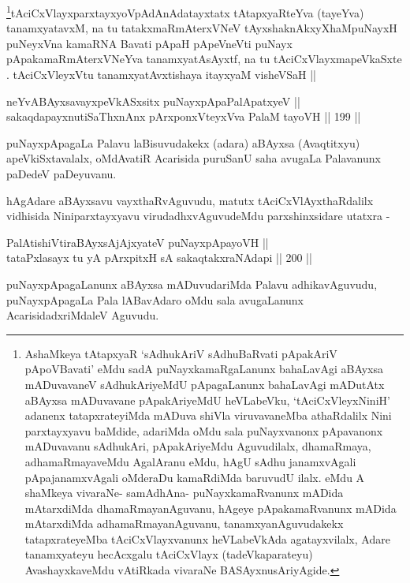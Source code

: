 \footnote{AshaMkeya tAtapxyaR `sAdhukAriV sAdhuBaRvati pApakAriV
pApoVBavati' eMdu sadA puNayxkamaRgaLanunx bahaLavAgi aBAyxsa
mADuvavaneV sAdhukAriyeMdU pApagaLanunx bahaLavAgi mADutAtx aBAyxsa
mADuvavane pApakAriyeMdU heVLabeVku, `tAciCxVleyxNiniH' adanenx
tatapxrateyiMda mADuva shiVla viruvavaneMba athaRdalilx Nini parxtayxyavu baMdide, adariMda oMdu sala puNayxvanonx pApavanonx
mADuvavanu sAdhukAri, pApakAriyeMdu Aguvudilalx, dhamaRmaya,
adhamaRmayaveMdu AgalAranu eMdu, hAgU sAdhu janamxvAgali
pApajanamxvAgali oMderaDu kamaRdiMda baruvudU ilalx. eMdu A shaMkeya
vivaraNe- samAdhAna- puNayxkamaRvanunx mADida mAtarxdiMda
dhamaRmayanAguvanu, hAgeye pApakamaRvanunx mADida mAtarxdiMda
adhamaRmayanAguvanu, tanamxyanAguvudakekx tatapxrateyeMba
tAciCxVlayxvanunx heVLabeVkAda agatayxvilalx, Adare tanamxyateyu
hecAcxgalu tAciCxVlayx (tadeVkaparateyu) AvashayxkaveMdu vAtiRkada
vivaraNe BASAyxnusAriyAgide.}tAciCxVlayxparxtayxyoVpAdAnAdatayxtatx tAtapxyaRteYva (tayeYva) tanamxyatavxM, na tu tatakxmaRmAterxVNeV tAyxshaknAkxyX\s \s haMpuNayxH puNeyxVna kamaRNA Bavati pApaH pApeVneVti puNayx pApakamaRmAterxVNeYva tanamxyatAsAyxtf, na tu tAciCxVlayxmapeVkaSxte . tAciCxVleyxVtu tanamxyatAvxtishaya itayxyaM visheVSaH ||


\begin{shl}
neYvABAyxsavayxpeVkASx\s sitx puNayxpApaPalApatxyeV || \\
sakaqdapayxnutiSaThxnAnx pArxponxVteyxVva PalaM tayoVH \hfill || 199 || 
\end{shl}

\begin{artha}
puNayxpApagaLa Palavu laBisuvudakekx (adara) aBAyxsa (Avaqtitxyu)
apeVkiSxtavalalx, oMdAvatiR Acarisida puruSanU saha avugaLa
Palavanunx paDedeV paDeyuvanu.
\end{artha}

\begin{artha}
hAgAdare aBAyxsavu vayxthaRvAguvudu, matutx tAciCxVlAyxthaRdalilx
vidhisida Niniparxtayxyavu virudadhxvAguvudeMdu parxshinxsidare utatxra -
\end{artha}

\begin{shl}
PalAtishiVtiraBAyxsAjAjxyateV puNayxpApayoVH || \\
tataPxlasayx tu yA pArxpitxH sA sakaqtakxraNAdapi \hfill || 200 ||  
\end{shl}

\begin{artha}
puNayxpApagaLanunx aBAyxsa mADuvudariMda Palavu adhikavAguvudu,
puNayxpApagaLa Pala lABavAdaro oMdu sala avugaLanunx
AcarisidadxriMdaleV Aguvudu.
\end{artha}

